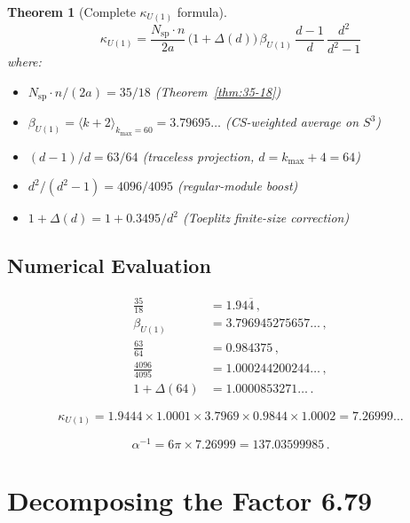 \documentclass[12pt,a4paper]{article}
\newtheorem{theorem}{Theorem}[section]
\theoremstyle{definition}
\begin{document}
\begin{theorem}[Complete $\kappa_{U(1)}$ formula]
\label{thm:kappa-complete}
\begin{equation}\label{eq:kappa-complete}
\boxed{
\kappa_{U(1)} = \frac{N_{\mathrm{sp}} \cdot n}{2a}\,
\bigl(1 + \Delta(d)\bigr)\,\beta_{U(1)}\,
\frac{d-1}{d}\,\frac{d^2}{d^2-1}
}
\end{equation}
where:
\begin{itemize}
\item $N_{\mathrm{sp}} \cdot n / (2a) = 35/18$ \quad (Theorem~\ref{thm:35-18})
\item $\beta_{U(1)} = \langle k{+}2 \rangle_{k_{\max}=60} = 3.79695\ldots$
  \quad (CS-weighted average on $S^3$)
\item $(d{-}1)/d = 63/64$ \quad (traceless projection, $d = k_{\max}+4 = 64$)
\item $d^2/(d^2{-}1) = 4096/4095$ \quad (regular-module boost)
\item $1 + \Delta(d) = 1 + 0.3495/d^2$ \quad (Toeplitz finite-size correction)
\end{itemize}
\end{theorem}

\subsection{Numerical Evaluation}

\begin{align}
\frac{35}{18} &= 1.94\overline{4}\,, \\[4pt]
\beta_{U(1)} &= 3.796945275657\ldots\,, \\[4pt]
\frac{63}{64} &= 0.984375\,, \\[4pt]
\frac{4096}{4095} &= 1.000244200244\ldots\,, \\[4pt]
1 + \Delta(64) &= 1.0000853271\ldots\,.
\end{align}

\begin{equation}
\kappa_{U(1)} = 1.9444 \times 1.0001 \times 3.7969 \times 0.9844 \times 1.0002
= 7.26999\ldots
\end{equation}

\begin{equation}
\alpha^{-1} = 6\pi \times 7.26999 = 137.03599985\,.
\end{equation}

\section{Decomposing the Factor 6.79}
\label{sec:decompose}
\end{document}
